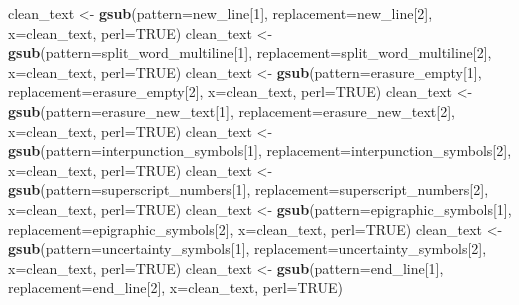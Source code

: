 \documentclass[]{article}
\newenvironment{Shaded}{\begin{snugshade}}{\end{snugshade}}
\newcommand{\DataTypeTok}[1]{\textcolor[rgb]{0.13,0.29,0.53}{#1}}
\newcommand{\DecValTok}[1]{\textcolor[rgb]{0.00,0.00,0.81}{#1}}
\newcommand{\KeywordTok}[1]{\textcolor[rgb]{0.13,0.29,0.53}{\textbf{#1}}}
\newcommand{\NormalTok}[1]{#1}
\newcommand{\OtherTok}[1]{\textcolor[rgb]{0.56,0.35,0.01}{#1}}
\newcommand{\StringTok}[1]{\textcolor[rgb]{0.31,0.60,0.02}{#1}}
\begin{document}
\begin{Shaded}
\begin{Highlighting}[]
\NormalTok{   clean_text <-}\StringTok{ }\KeywordTok{gsub}\NormalTok{(}\DataTypeTok{pattern=}\NormalTok{new_line[}\DecValTok{1}\NormalTok{], }\DataTypeTok{replacement=}\NormalTok{new_line[}\DecValTok{2}\NormalTok{], }\DataTypeTok{x=}\NormalTok{clean_text, }\DataTypeTok{perl=}\OtherTok{TRUE}\NormalTok{)}
\NormalTok{   clean_text <-}\StringTok{ }\KeywordTok{gsub}\NormalTok{(}\DataTypeTok{pattern=}\NormalTok{split_word_multiline[}\DecValTok{1}\NormalTok{], }\DataTypeTok{replacement=}\NormalTok{split_word_multiline[}\DecValTok{2}\NormalTok{], }\DataTypeTok{x=}\NormalTok{clean_text, }\DataTypeTok{perl=}\OtherTok{TRUE}\NormalTok{)}
\NormalTok{   clean_text <-}\StringTok{ }\KeywordTok{gsub}\NormalTok{(}\DataTypeTok{pattern=}\NormalTok{erasure_empty[}\DecValTok{1}\NormalTok{], }\DataTypeTok{replacement=}\NormalTok{erasure_empty[}\DecValTok{2}\NormalTok{], }\DataTypeTok{x=}\NormalTok{clean_text, }\DataTypeTok{perl=}\OtherTok{TRUE}\NormalTok{)}
\NormalTok{   clean_text <-}\StringTok{ }\KeywordTok{gsub}\NormalTok{(}\DataTypeTok{pattern=}\NormalTok{erasure_new_text[}\DecValTok{1}\NormalTok{], }\DataTypeTok{replacement=}\NormalTok{erasure_new_text[}\DecValTok{2}\NormalTok{], }\DataTypeTok{x=}\NormalTok{clean_text, }\DataTypeTok{perl=}\OtherTok{TRUE}\NormalTok{)}
\NormalTok{   clean_text <-}\StringTok{ }\KeywordTok{gsub}\NormalTok{(}\DataTypeTok{pattern=}\NormalTok{interpunction_symbols[}\DecValTok{1}\NormalTok{], }\DataTypeTok{replacement=}\NormalTok{interpunction_symbols[}\DecValTok{2}\NormalTok{], }\DataTypeTok{x=}\NormalTok{clean_text, }\DataTypeTok{perl=}\OtherTok{TRUE}\NormalTok{)}
\NormalTok{   clean_text <-}\StringTok{ }\KeywordTok{gsub}\NormalTok{(}\DataTypeTok{pattern=}\NormalTok{superscript_numbers[}\DecValTok{1}\NormalTok{], }\DataTypeTok{replacement=}\NormalTok{superscript_numbers[}\DecValTok{2}\NormalTok{], }\DataTypeTok{x=}\NormalTok{clean_text, }\DataTypeTok{perl=}\OtherTok{TRUE}\NormalTok{)}
\NormalTok{   clean_text <-}\StringTok{ }\KeywordTok{gsub}\NormalTok{(}\DataTypeTok{pattern=}\NormalTok{epigraphic_symbols[}\DecValTok{1}\NormalTok{], }\DataTypeTok{replacement=}\NormalTok{epigraphic_symbols[}\DecValTok{2}\NormalTok{], }\DataTypeTok{x=}\NormalTok{clean_text, }\DataTypeTok{perl=}\OtherTok{TRUE}\NormalTok{)}
\NormalTok{   clean_text <-}\StringTok{ }\KeywordTok{gsub}\NormalTok{(}\DataTypeTok{pattern=}\NormalTok{uncertainty_symbols[}\DecValTok{1}\NormalTok{], }\DataTypeTok{replacement=}\NormalTok{uncertainty_symbols[}\DecValTok{2}\NormalTok{], }\DataTypeTok{x=}\NormalTok{clean_text, }\DataTypeTok{perl=}\OtherTok{TRUE}\NormalTok{)}
\NormalTok{   clean_text <-}\StringTok{ }\KeywordTok{gsub}\NormalTok{(}\DataTypeTok{pattern=}\NormalTok{end_line[}\DecValTok{1}\NormalTok{], }\DataTypeTok{replacement=}\NormalTok{end_line[}\DecValTok{2}\NormalTok{], }\DataTypeTok{x=}\NormalTok{clean_text, }\DataTypeTok{perl=}\OtherTok{TRUE}\NormalTok{)}

\end{Highlighting}
\end{Shaded}
\end{document}
